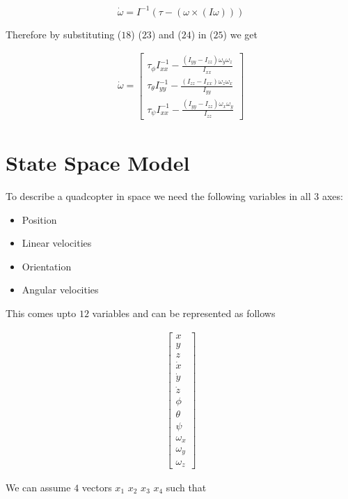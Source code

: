 \documentclass[9pt]{article}
\begin{document}
\begin{equation}
\dot{\omega}=I^{-1}(\tau - (\omega \times (I\omega)))
\end{equation}

\noindent Therefore by substituting ($18$) ($23$) and ($24$) in ($25$) we get 

\begin{eqnarray}
\dot{\omega} =
\left[
\begin{matrix}
\tau_{\phi}I_{xx}^{-1} - \frac{(I_{yy}-I_{zz})\omega_{y}\omega_{z}}{I_{xx}} \\
\tau_{\theta}I_{yy}^{-1} - \frac{(I_{zz}-I_{xx})\omega_{z}\omega_{x}}{I_{yy}} \\
\tau_{\psi}I_{xx}^{-1} - \frac{(I_{yy}-I_{zz})\omega_{x}\omega_{y}}{I_{zz}} 
\end{matrix}
\right]
\end{eqnarray}

\section{State Space Model}

To describe a quadcopter in space we need the following variables in all $3$ axes:
\begin{itemize}
\item Position
\item Linear velocities
\item Orientation
\item Angular velocities
\end{itemize}

\noindent This comes upto $12$ variables and can be represented as follows

\begin{eqnarray}
\left[
\begin{matrix}
x \\
y \\
z \\
\dot{x} \\
\dot{y} \\
\dot{z} \\
\phi \\
\theta \\ 
\psi \\
\omega_{x} \\
\omega_{y} \\
\omega_{z}  
\end{matrix}
\right]
\end{eqnarray}

\noindent We can assume $4$ vectors $x_{1}$ $x_{2}$ $x_{3}$ $x_{4}$ such that
\end{document}
